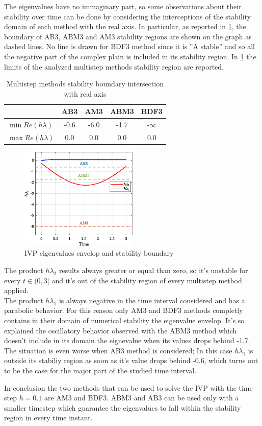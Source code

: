 \documentclass[11pt,a4paper,oneside]{article}
\begin{document}
The eigenvalues have no immaginary part, so some observations about their stability over time can be done by considering the interceptions of the stability domain of each method with the real axis.
In particular, as reported in \cref{fig:ex7_eig}, the boundary of AB3, ABM3 and AM3 stability regions are shown on the graph as dashed lines.
No line is drawn for BDF3 method since it is ''A stable'' and so all the negative part of the complex plain is included in its stability region.
In \cref{tab:ex7_stabLim} the limits of the analyzed multistep methods stability region are reported.
\begin{table}[htb]
    \centering
    \caption{Multistep methods stability boundary intersection with real axis}
    \label{tab:ex7_stabLim}
    \begin{tabular}{lcccc}
            \toprule
            \toprule
            & AB3 & AM3 & ABM3 & BDF3   \\ 
            \midrule
            $\min Re(h\lambda)$ & -0.6 & -6.0 & -1.7 & -$\infty$    \\
            $\max Re(h\lambda)$ & 0.0  & 0.0  & 0.0  & 0.0          \\
            \bottomrule
            \bottomrule
        \end{tabular}
\end{table}

\clearpage

\begin{figure}[htb]
    \centering
    \includegraphics*[width=0.5\textwidth, keepaspectratio]{ex7_eig.eps}
    \caption[]{\label{fig:ex7_eig} IVP eigenvalues envelop and stability boundary}
\end{figure}

The product $h\lambda_2$ results always greater or equal than zero, so it's unstable for every $t\in(0,3]$ and it's out of the stability region of every multistep method applied. \\
The product $h\lambda_1$ is always negative in the time interval considered and has a parabolic behavior.
For this reason only AM3 and BDF3 methods completly contains in their domain of numerical stability the eigenvalue envelop.
It's so explained the oscillatory behavior observed with the ABM3 method which doesn't include in its domain the eignevalue when its values drops behind -1.7.
The situation is even worse when AB3 method is considered; In this case $h\lambda_1$ is outside its stabiliy region as soon as it's value drops behind -0.6, which turns out to be the case for the major part of the studied time interval.

In conclusion the two methods that can be used to solve the IVP with the time step $h=0.1$ are AM3 and BDF3. ABM3 and AB3 can be used only with a smaller timestep which guarantee the eigenvalues to fall within the stability region in every time instant.

\clearpage
\end{document}
